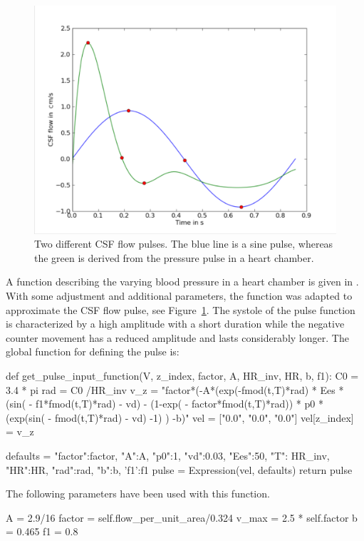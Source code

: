 \begin{figure}
\center\includegraphics[width=\largefig]{chapters/hentschel/pdf/sin_pulse.pdf}
\caption{Two different CSF flow pulses. The blue line is a sine pulse,
    whereas the green is derived from the pressure pulse in a heart
    chamber.}
\label{fig:sin_pulse}
\end{figure}

A function describing the varying blood pressure in a heart chamber is
given in \citet{SmithChase2ShawEtAl2006}.  With some adjustment and
additional parameters, the function was adapted to approximate the CSF
flow pulse, see Figure~\ref{fig:sin_pulse}.  The systole of the pulse
function is characterized by a high amplitude with a short duration
while the negative counter movement has a reduced amplitude and lasts
considerably longer.  The global function for defining the pulse is:
\begin{python}
def get_pulse_input_function(V, z_index, factor, A, HR_inv, HR, b, f1):
        C0 = 3.4 * pi
        rad = C0 /HR_inv
        v_z = "factor*(-A*(exp(-fmod(t,T)*rad) * Ees * (sin( - f1*fmod(t,T)*rad) - vd)
              - (1-exp( - factor*fmod(t,T)*rad)) * p0 * (exp(sin( - fmod(t,T)*rad) - vd) -1) ) -b)"
        vel = ["0.0", "0.0", "0.0"]
        vel[z_index] = v_z

        defaults = {"factor":factor, "A":A, "p0":1, "vd":0.03, "Ees":50,
                    "T": HR_inv, "HR":HR, "rad":rad, "b":b, 'f1':f1}
        pulse = Expression(vel, defaults)
        return pulse
\end{python}
The following parameters have been used with this function.
\begin{python}
A = 2.9/16
factor = self.flow_per_unit_area/0.324
v_max = 2.5 * self.factor
b = 0.465
f1 = 0.8
\end{python}

